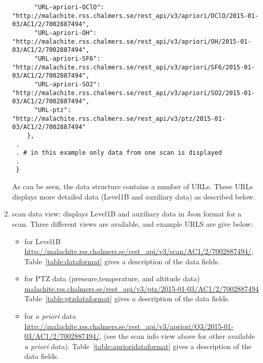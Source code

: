 \begin{enumerate}
\begin{tiny}
\begin{verbatim}
      "URL-apriori-OClO": "http://malachite.rss.chalmers.se/rest_api/v3/apriori/OClO/2015-01-03/AC1/2/7002887494", 
      "URL-apriori-OH": "http://malachite.rss.chalmers.se/rest_api/v3/apriori/OH/2015-01-03/AC1/2/7002887494", 
      "URL-apriori-SF6": "http://malachite.rss.chalmers.se/rest_api/v3/apriori/SF6/2015-01-03/AC1/2/7002887494", 
      "URL-apriori-SO2": "http://malachite.rss.chalmers.se/rest_api/v3/apriori/SO2/2015-01-03/AC1/2/7002887494", 
      "URL-ptz": "http://malachite.rss.chalmers.se/rest_api/v3/ptz/2015-01-03/AC1/2/7002887494"
    },
 .
 . # in this example only data from one scan is displayed
 . 
 }  
\end{verbatim}
\end{tiny}
As can be seen, the data structure contains a number of URLs. These URLs displays more detailed
data (Level1B and auxiliary data) as described below.


\item scan data view: displays Level1B and auxiliary data in Json format for a scan.
Three different views are available, and example URLS are give below: 
\begin{itemize}
\item for Level1B \url{http://malachite.rss.chalmers.se/rest_api/v3/scan/AC1/2/7002887494/},
     Table~\ref{table:dataformat} gives a description of the data fields.

\item for PTZ data (pressure,temperature, and altitude data) 
\url{malachite.rss.chalmers.se/rest_api/v3/ptz/2015-01-03/AC1/2/7002887494}
 Table~\ref{table:ptzdataformat} gives a description of the data fields.

\item for \textit{a priori}  data 
\url{http://malachite.rss.chalmers.se/rest_api/v3/apriori/O3/2015-01-03/AC1/2/7002887494/},
(see the scan info view above for other available \textit{a priori} data).
 Table~\ref{table:aprioridataformat} gives a description of the data fields.
 
\end{itemize}
	

\end{enumerate}

